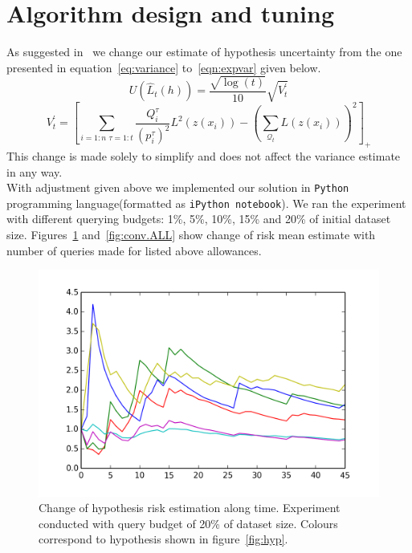\documentclass[12pt, a4paper, pdflatex, leqno]{report}
\begin{document}
\section{Algorithm design and tuning}
As suggested in~\citep{DBLP:journals/corr/GantiG13} we change our estimate of hypothesis uncertainty from the one presented in equation~\ref{eq:variance} to~\ref{eqn:expvar} given below.\\
\begin{equation}
\label{eqn:expvar}
U(\hat{L}_t(h)) = \frac{ \sqrt{ \log(t) } }
                       { 10 }
                  \sqrt{ V^\prime_t }
\end{equation}
$$
V^\prime_t = \left[
  \sum_{i = 1:n \text{~} \tau = 1:t} \frac{Q^\tau_i}{(p^\tau_i)^2} L^2(z(x_i))
  -
  \left( \sum_{\mathscr{Q}_t} L(z(x_i)) \right)^2
\right]_+
$$
This change is made solely to simplify and does not affect the variance estimate in any way.\\

With adjustment given above we implemented our solution in \texttt{Python} programming language(formatted as \texttt{iPython notebook}). We ran the experiment with different querying budgets: 1\%, 5\%, 10\%, 15\% and 20\% of initial dataset size. Figures~\ref{fig:conv} and~\ref{fig:conv.ALL} show change of risk mean estimate with number of queries made for listed above allowances.\\


\begin{figure}[htbp]
  \centering
  \includegraphics[width=0.7\linewidth]{graphics/convergence.png}
  \begin{tiny}
    \caption{Change of hypothesis risk estimation along time. Experiment conducted with query budget of 20\% of dataset size. Colours correspond to hypothesis shown in figure~\ref{fig:hyp}.\label{fig:conv}}
  \end{tiny}
  \vspace{1cm}
\end{figure}
\end{document}
